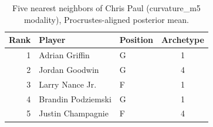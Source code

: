 \begin{table}[htbp]
  \centering\small
  \begin{tabular}{rllc}
    \toprule
    Rank & Player & Position & Archetype \\
    \midrule
    1 & Adrian Griffin & G & 1 \\
    2 & Jordan Goodwin & G & 4 \\
    3 & Larry Nance Jr. & F & 1 \\
    4 & Brandin Podziemski & G & 1 \\
    5 & Justin Champagnie & F & 4 \\
    \bottomrule
  \end{tabular}
  \caption{Five nearest neighbors of Chris Paul (curvature_m5 modality), Procrustes-aligned posterior mean.}
  \label{tab:Chris_Paul_neighbors_curvature_m5}
\end{table}

